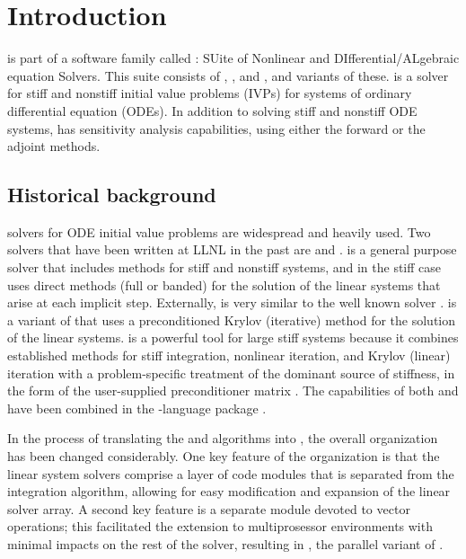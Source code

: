 \chapter{Introduction}\label{s:intro}

{\cvodes} is part of a software family called {\sundials}: 
SUite of Nonlinear and DIfferential/ALgebraic equation Solvers.  
This suite consists of {\cvode}, {\kinsol}, and {\ida}, and variants of these. 
%
{\cvodes} is a solver for stiff and
nonstiff initial value problems (IVPs) for systems of ordinary differential equation
(ODEs). In addition to solving stiff and nonstiff ODE systems, {\cvodes} has sensitivity 
analysis capabilities, using either the forward or the adjoint methods.

\section{Historical background}\label{ss:history}

{\F} solvers for ODE initial value problems are widespread and heavily used. 
Two solvers that have been written at LLNL in the past are {\vode} \cite{BBH:89} 
and {\vodpk} \cite{Byr:92}.
{\vode} is a general purpose solver that includes methods for stiff
and nonstiff systems, and in the stiff case uses direct methods (full or
banded) for the solution of the linear systems that arise at each implicit
step. Externally, {\vode} is very similar to the well known solver
{\lsode} \cite{RaHi:94}.
{\vodpk} is a variant of {\vode} that uses a preconditioned Krylov 
(iterative) method for the solution of the linear systems. {\vodpk} is a powerful 
tool for large stiff systems because it combines established methods for stiff 
integration, nonlinear iteration, and Krylov (linear) iteration with a problem-specific
treatment of the dominant source of stiffness, in the form of the user-supplied
preconditioner matrix \cite{BrHi:89}.
The capabilities of both {\vode} and {\vodpk} have been combined in the {\C}-language 
package {\cvode} \cite{CoHi:94, CoHi:96}.

In the process of translating the {\vode} and {\vodpk} algorithms into {\C}, the overall 
{\cvode} organization has been changed considerably.
One key feature of the {\cvode} organization is that the linear system solvers comprise a
layer of code modules that is separated from the integration algorithm, allowing for 
easy modification and expansion of the linear solver array.
A second key feature is a separate module devoted to vector operations; this 
facilitated the extension to multiprosessor environments with minimal impacts 
on the rest of the solver, resulting in {\pvode} \cite{ByHi:99}, 
the parallel variant of {\cvode}.

